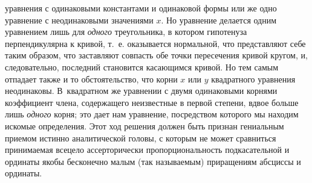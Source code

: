 уравнения с одинаковыми константами и одинаковой формы или же одно уравнение с
неодинаковыми значениями $x$. Но уравнение делается одним уравнением лишь для
{\em одного} треугольника, в котором гипотенуза перпендикулярна к кривой, т.~е.
оказывается нормальной, что представляют себе таким образом, что заставляют
совпасть обе точки пересечения кривой кругом, и, следовательно, последний
становится касающимся кривой. Но тем самым отпадает также и то обстоятельство,
что корни $x$ или $y$ квадратного уравнения неодинаковы. В~квадратном же
уравнении с двумя одинаковыми корнями коэффициент члена, содержащего
неизвестные в первой степени, вдвое больше лишь {\em одного} корня; это дает
нам уравнение, посредством которого мы находим искомые определения. Этот ход
решения должен быть признан гениальным приемом истинно аналитической головы, с
которым не может сравниться принимаемая всецело ассерторически
пропорциональность подкасательной и ординаты якобы бесконечно малым (так
называемым) приращениям абсциссы и ординаты.

